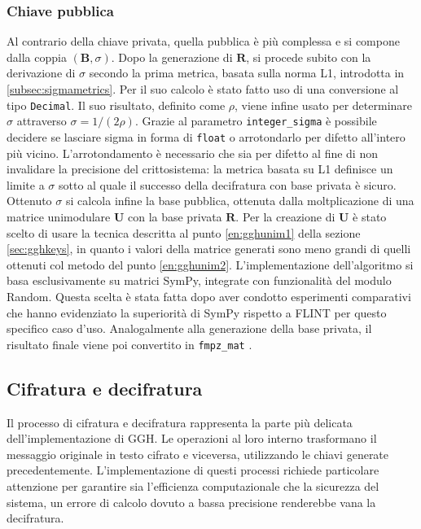\subsubsection{Chiave pubblica}
Al contrario della chiave privata, quella pubblica è più complessa e si compone dalla coppia
$(\mathbf{B}, \sigma)$.
Dopo la generazione di $\mathbf{R}$, si procede subito con la derivazione di $\sigma$ secondo 
la prima metrica, basata sulla norma L1, introdotta in \ref{subsec:sigmametrics}. 
Per il suo calcolo 
è stato fatto uso di una conversione al tipo \texttt{Decimal}. Il suo risultato, 
definito come $\rho$, viene infine usato per determinare $\sigma$ attraverso 
$\sigma = 1 / (2\rho)$. Grazie al parametro \texttt{integer\_sigma} è possibile decidere
se lasciare sigma in forma di \texttt{float} o arrotondarlo per difetto all'intero più vicino.
L'arrotondamento è necessario che sia per difetto al fine di non invalidare la precisione 
del crittosistema: la metrica basata su L1 definisce un limite a $\sigma$ sotto al quale
il successo della decifratura con base privata è sicuro. Ottenuto $\sigma$ si calcola infine
la base pubblica, ottenuta dalla moltplicazione di una matrice unimodulare $\mathbf{U}$ con
la base privata $\mathbf{R}$. Per la creazione di $\mathbf{U}$ è stato scelto di usare
la tecnica descritta al punto \ref{en:gghunim1} della sezione \ref{sec:gghkeys}, in quanto
i valori della matrice generati sono meno grandi di quelli ottenuti col metodo del punto
\ref{en:gghunim2}.
L'implementazione dell'algoritmo si basa esclusivamente su matrici SymPy, integrate 
con funzionalità del modulo Random. Questa scelta è stata fatta dopo aver condotto 
esperimenti comparativi che hanno evidenziato la superiorità di SymPy rispetto a FLINT 
per questo specifico caso d'uso. Analogalmente alla generazione della base privata,
il risultato finale viene poi convertito in \texttt{fmpz\_mat} .

\subsection{Cifratura e decifratura}

Il processo di cifratura e decifratura rappresenta la parte più delicata dell'implementazione di GGH.
Le operazioni al loro interno trasformano il messaggio originale in testo cifrato e viceversa, 
utilizzando le chiavi generate precedentemente. L'implementazione di questi processi 
richiede particolare attenzione per garantire sia l'efficienza computazionale che la 
sicurezza del sistema, un errore di calcolo dovuto a bassa precisione renderebbe vana 
la decifratura.


